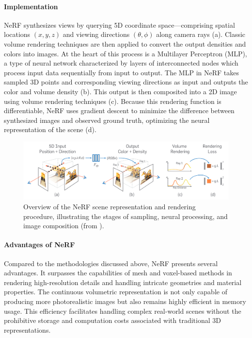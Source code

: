 \paragraph{Implementation}
NeRF synthesizes views by querying 5D coordinate space—comprising spatial locations \((x, y, z)\) and viewing directions \((\theta, \phi)\) along camera rays (a).
Classic volume rendering techniques are then applied to convert the output densities and colors into images.
At the heart of this process is a Multilayer Perceptron (MLP), a type of neural network characterized by layers of interconnected nodes which process input data sequentially from input to output.
The MLP in NeRF takes sampled 3D points and corresponding viewing directions as input and outputs the color and volume density (b).
This output is then composited into a 2D image using volume rendering techniques (c).
Because this rendering function is differentiable, NeRF uses gradient descent to minimize the difference between synthesized images and observed ground truth, optimizing the neural representation of the scene (d).

\begin{figure}[h!]
  \centering
  \includegraphics[width=\textwidth]{figures/bg-nerf.png}
  \caption{Overview of the NeRF scene representation and rendering procedure, illustrating the stages of sampling, neural processing, and image composition (from \cite{mildenhall_nerf_2021}).}
  \label{fig:nerf-overview}
\end{figure}

\paragraph{Advantages of NeRF}
Compared to the methodologies discussed above, NeRF presents several advantages.
It surpasses the capabilities of mesh and voxel-based methods in rendering high-resolution details and handling intricate geometries and material properties.
The continuous volumetric representation is not only capable of producing more photorealistic images but also remains highly efficient in memory usage.
This efficiency facilitates handling complex real-world scenes without the prohibitive storage and computation costs associated with traditional 3D representations.

